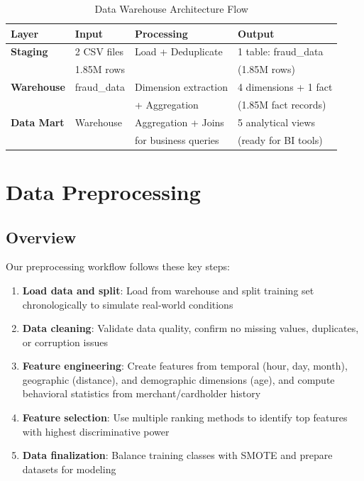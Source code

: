\begin{table}[H]
\centering
\begin{tabular}{|l|l|l|l|}
\hline
\textbf{Layer} & \textbf{Input} & \textbf{Processing} & \textbf{Output} \\
\hline
\textbf{Staging} & 2 CSV files & Load + Deduplicate & 1 table: fraud\_data \\
& 1.85M rows & & (1.85M rows) \\
\hline
\textbf{Warehouse} & fraud\_data & Dimension extraction & 4 dimensions + 1 fact \\
& & + Aggregation & (1.85M fact records) \\
\hline
\textbf{Data Mart} & Warehouse & Aggregation + Joins & 5 analytical views \\
& & for business queries & (ready for BI tools) \\
\hline
\end{tabular}
\caption{Data Warehouse Architecture Flow}
\label{tab:dataflow}
\end{table}

\section{Data Preprocessing}

\subsection{Overview}

Our preprocessing workflow follows these key steps:
\begin{enumerate}
    \item \textbf{Load data and split}: Load from warehouse and split training set chronologically to simulate real-world conditions
    \item \textbf{Data cleaning}: Validate data quality, confirm no missing values, duplicates, or corruption issues
    \item \textbf{Feature engineering}: Create features from temporal (hour, day, month), geographic (distance), and demographic dimensions (age), and compute behavioral statistics from merchant/cardholder history
    \item \textbf{Feature selection}: Use multiple ranking methods to identify top features with highest discriminative power
    \item \textbf{Data finalization}: Balance training classes with SMOTE and prepare datasets for modeling
\end{enumerate}


